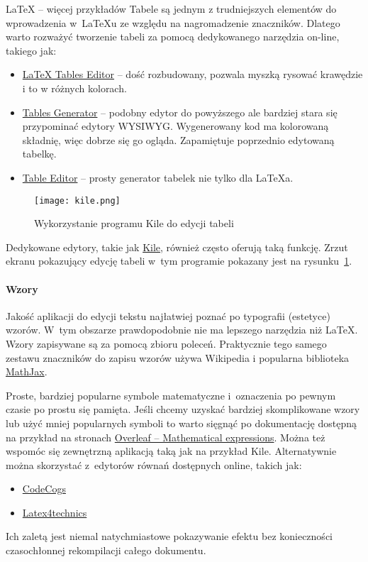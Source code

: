 \begin{easyappendix}{\LaTeX{} -- więcej przykładów}
Tabele są jednym z trudniejszych elementów do wprowadzenia w~\LaTeX{u} ze względu na nagromadzenie znaczników. Dlatego warto rozważyć tworzenie tabeli za pomocą dedykowanego narzędzia on-line, takiego jak:

\begin{itemize}
	\item \href{https://www.latex-tables.com/}{LaTeX Tables Editor} -- dość rozbudowany, pozwala myszką rysować krawędzie i to w różnych kolorach.
	\item \href{https://www.tablesgenerator.com/}{Tables Generator} -- podobny edytor do powyższego ale bardziej stara się przypominać edytory WYSIWYG. Wygenerowany kod ma kolorowaną składnię, więc dobrze się go ogląda. Zapamiętuje poprzednio edytowaną tabelkę.
	\item \href{https://truben.no/table/}{Table Editor} -- prosty generator tabelek nie tylko dla LaTeXa.	
\end{itemize}

\begin{figure}[!ht]
	\centering \texttt{[image: kile.png]} %
	\caption{Wykorzystanie programu Kile do edycji tabeli}
	\label{rys:kile}
\end{figure}

Dedykowane edytory, takie jak \href{https://kile.sourceforge.io/}{Kile}, również często oferują taką funkcję. Zrzut ekranu pokazujący edycję tabeli w~tym programie pokazany jest na rysunku~\ref{rys:kile}.

\paragraph{Wzory}
Jakość aplikacji do edycji tekstu najłatwiej poznać po typografii (estetyce) wzorów. W~tym obszarze prawdopodobnie nie ma lepszego narzędzia niż \LaTeX{}. Wzory zapisywane są za pomocą zbioru poleceń. Praktycznie tego samego zestawu znaczników do zapisu wzorów używa Wikipedia i popularna biblioteka \href{https://www.mathjax.org/}{MathJax}.

Proste, bardziej popularne symbole matematyczne i~oznaczenia po pewnym czasie po prostu się pamięta. Jeśli chcemy uzyskać bardziej skomplikowane wzory lub użyć mniej popularnych symboli to warto sięgnąć po dokumentację dostępną na przykład na stronach \href{https://www.overleaf.com/learn/latex/Mathematical_expressions}{Overleaf -- Mathematical expressions}. Można też wspomóc się zewnętrzną aplikacją taką jak na przykład Kile. Alternatywnie można skorzystać z~edytorów równań dostępnych online, takich jak:
\begin{itemize}
	\item \href{https://latex.codecogs.com/eqneditor/editor.php}{CodeCogs}
	\item \href{https://www.latex4technics.com/}{Latex4technics}
\end{itemize}
Ich zaletą jest niemal natychmiastowe pokazywanie efektu bez konieczności czasochłonnej rekompilacji całego dokumentu.


\end{easyappendix}
